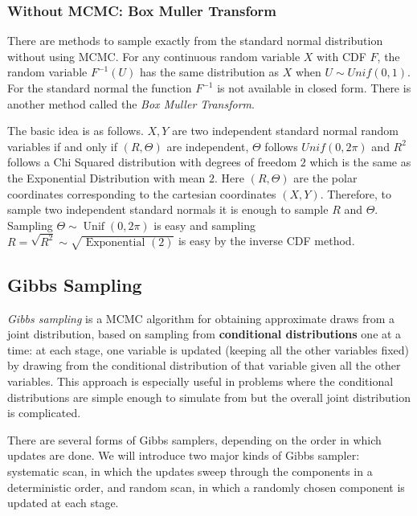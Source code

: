 \documentclass[11pt,a4paper]{article}
\begin{document}
\subsubsection{Without MCMC: Box Muller Transform}
There are methods to sample exactly from the standard normal distribution without using MCMC. For any continuous random variable $X$ with CDF $F$, the random variable $F^{-1}(U)$ has the same distribution as $X$ when $U \sim Unif(0,1)$. For the standard normal the function $F^{-1}$ is not available in closed form. There is another method called the \textit{Box Muller Transform}.

The basic idea is as follows. $X, Y$ are two independent standard normal random variables if and only if $(R, \Theta)$ are independent, $\Theta$ follows $Unif(0,2 \pi)$ and $R^2$ follows a Chi Squared distribution with degrees of freedom $2$ which is the same as the Exponential Distribution with mean $2$. Here $(R, \Theta)$ are the polar coordinates corresponding to the cartesian coordinates $(X, Y)$. Therefore, to sample two independent standard normals it is enough to sample $R$ and $\Theta$. Sampling $\Theta \sim \operatorname{Unif}(0,2 \pi)$ is easy and sampling $R=\sqrt{R^2} \sim \sqrt{\text { Exponential }(2)}$ is easy by the inverse CDF method.

\subsection{Gibbs Sampling}
\textit{Gibbs sampling} is a MCMC algorithm for obtaining approximate draws from a joint distribution, based on sampling from \textbf{conditional distributions} one at a time: at each stage, one variable is updated (keeping all the other variables fixed) by drawing from the conditional distribution of that variable given all the other variables. This approach is especially useful in problems where the conditional distributions are simple enough to simulate from but the overall joint distribution is complicated.

There are several forms of Gibbs samplers, depending on the order in which updates are done. We will introduce two major kinds of Gibbs sampler: systematic scan, in which the updates sweep through the components in a deterministic order, and random scan, in which a randomly chosen component is updated at each stage.
\end{document}
